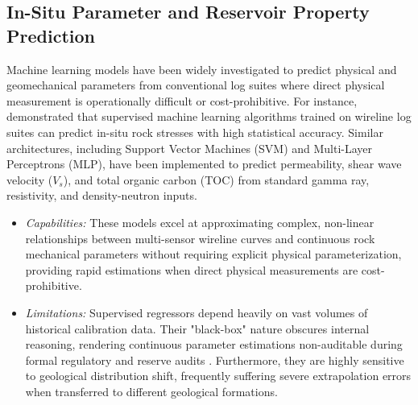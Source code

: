 \subsection{In-Situ Parameter and Reservoir Property Prediction}
Machine learning models have been widely investigated to predict physical and geomechanical parameters from conventional log suites where direct physical measurement is operationally difficult or cost-prohibitive. For instance, \citet{ref5} demonstrated that supervised machine learning algorithms trained on wireline log suites can predict in-situ rock stresses with high statistical accuracy. Similar architectures, including Support Vector Machines (SVM) and Multi-Layer Perceptrons (MLP), have been implemented to predict permeability, shear wave velocity ($V_s$), and total organic carbon (TOC) from standard gamma ray, resistivity, and density-neutron inputs.
\begin{itemize}
    \item \textit{Capabilities:} These models excel at approximating complex, non-linear relationships between multi-sensor wireline curves and continuous rock mechanical parameters without requiring explicit physical parameterization, providing rapid estimations when direct physical measurements are cost-prohibitive.
    \item \textit{Limitations:} Supervised regressors depend heavily on vast volumes of historical calibration data. Their "black-box" nature obscures internal reasoning, rendering continuous parameter estimations non-auditable during formal regulatory and reserve audits \citep{ref1, ref3}. Furthermore, they are highly sensitive to geological distribution shift, frequently suffering severe extrapolation errors when transferred to different geological formations.
\end{itemize}

